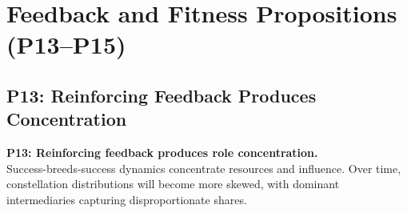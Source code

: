 \documentclass[../main.tex]{subfiles}
\begin{document}
\section{Feedback and Fitness Propositions (P13--P15)}

\subsection{P13: Reinforcing Feedback Produces Concentration}

\begin{propositionbox}
\textbf{P13: Reinforcing feedback produces role concentration.}\\[3pt]
Success-breeds-success dynamics concentrate resources and influence. Over time, constellation distributions will become more skewed, with dominant intermediaries capturing disproportionate shares.
\end{propositionbox}
\end{document}
